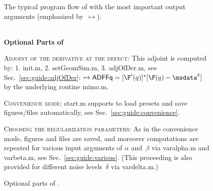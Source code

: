 \documentclass[a4paper]{article}
\begin{document}
\begin{figure}

\caption{The typical program flow of \IPscatt with the most important output arguments (emphasized by~$\mapsto$).}
\label{fig:flowChart}
\end{figure}

\begin{figure}
\hrulefill\\
\textbf{Optional Parts of \IPscatt}
\begin{compactitem}
  \item \textsc{Adjoint of the derivative at the defect:} This adjoint is computed by: 1. \textsf{init.m}, 2. \textsf{setGeomSim.m}, 3. \textsf{adjOfDer.m}, see Sec.~\ref{sec:guide:adjOfDer}: $\mapsto \textsf{ADFFq} = [\F'(q)]^\ast [\F(q) - \msdata^\delta]$ by the underlying routine \textsf{mimo.m}.
 \item \textsc{Convenience mode:} \textsf{start.m} supports to load presets and save figures/files automatically, see Sec.~\ref{sec:guide:convenience}.
 \item \textsc{Choosing the regularization parameters:} As in the convenience mode, figures and files are saved, and moreover computations are repeated for various input arguments of $\alpha$ and~$\beta$ via \textsf{varalpha.m} and \textsf{varbeta.m}, see Sec.~\ref{sec:guide:various}. (This proceeding is also provided for different noise levels~$\delta$ via \textsf{vardelta.m}.)
\end{compactitem}
\hrulefill
\caption{Optional parts of \IPscatt.}
\label{fig:flowChartOptional}
\end{figure}
\end{document}
